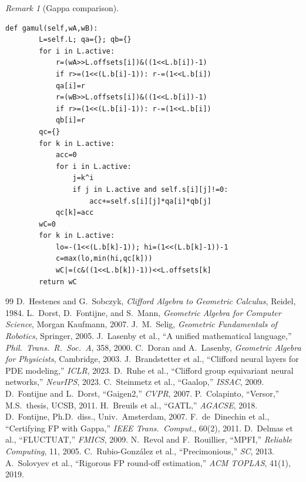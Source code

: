 \documentclass[11pt,a4paper]{article}
\theoremstyle{definition}
\theoremstyle{plain}
\theoremstyle{remark}
\newtheorem{remark}{Remark}[section]
\begin{document}
\begin{remark}[Gappa comparison]
\begin{lstlisting}[caption={Complete Python reference model for L-Rep},
  label=lst:python]
    def gamul(self,wA,wB):
        L=self.L; qa={}; qb={}
        for i in L.active:
            r=(wA>>L.offsets[i])&((1<<L.b[i])-1)
            if r>=(1<<(L.b[i]-1)): r-=(1<<L.b[i])
            qa[i]=r
            r=(wB>>L.offsets[i])&((1<<L.b[i])-1)
            if r>=(1<<(L.b[i]-1)): r-=(1<<L.b[i])
            qb[i]=r
        qc={}
        for k in L.active:
            acc=0
            for i in L.active:
                j=k^i
                if j in L.active and self.s[i][j]!=0:
                    acc+=self.s[i][j]*qa[i]*qb[j]
            qc[k]=acc
        wC=0
        for k in L.active:
            lo=-(1<<(L.b[k]-1)); hi=(1<<(L.b[k]-1))-1
            c=max(lo,min(hi,qc[k]))
            wC|=(c&((1<<L.b[k])-1))<<L.offsets[k]
        return wC
\end{lstlisting}

\begin{thebibliography}{99}
 D.~Hestenes and G.~Sobczyk, \emph{Clifford Algebra to Geometric Calculus}, Reidel, 1984.
 L.~Dorst, D.~Fontijne, and S.~Mann, \emph{Geometric Algebra for Computer Science}, Morgan Kaufmann, 2007.
 J.~M.~Selig, \emph{Geometric Fundamentals of Robotics}, Springer, 2005.
 J.~Lasenby et al., ``A unified mathematical language,'' \emph{Phil.\ Trans.\ R.\ Soc.\ A}, 358, 2000.
 C.~Doran and A.~Lasenby, \emph{Geometric Algebra for Physicists}, Cambridge, 2003.
 J.~Brandstetter et al., ``Clifford neural layers for PDE modeling,'' \emph{ICLR}, 2023.
 D.~Ruhe et al., ``Clifford group equivariant neural networks,'' \emph{NeurIPS}, 2023.
 C.~Steinmetz et al., ``Gaalop,'' \emph{ISSAC}, 2009.
 D.~Fontijne and L.~Dorst, ``Gaigen2,'' \emph{CVPR}, 2007.
 P.~Colapinto, ``Versor,'' M.S.\ thesis, UCSB, 2011.
 H.~Breuils et al., ``GATL,'' \emph{AGACSE}, 2018.
 D.~Fontijne, Ph.D.\ diss., Univ.\ Amsterdam, 2007.
 F.~de~Dinechin et al., ``Certifying FP with Gappa,'' \emph{IEEE Trans.\ Comput.}, 60(2), 2011.
 D.~Delmas et al., ``FLUCTUAT,'' \emph{FMICS}, 2009.
 N.~Revol and F.~Rouillier, ``MPFI,'' \emph{Reliable Computing}, 11, 2005.
 C.~Rubio-González et al., ``Precimonious,'' \emph{SC}, 2013.
 A.~Solovyev et al., ``Rigorous FP round-off estimation,'' \emph{ACM TOPLAS}, 41(1), 2019.

\end{thebibliography}
\end{remark}
\end{document}
